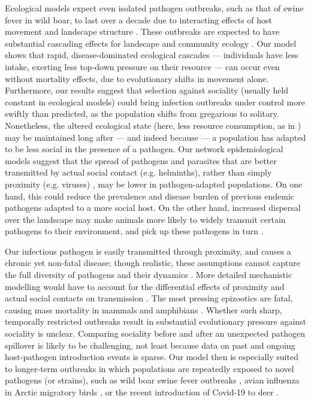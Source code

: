 Ecological models expect even isolated pathogen outbreaks, such as that of swine fever in wild boar, to last over a decade due to interacting effects of host movement and landscape structure \citep{scherer2020}.
These outbreaks are expected to have substantial cascading effects for landscape and community ecology \citep{monk2022}.
Our model shows that rapid, disease-dominated ecological cascades --- individuals have less intake, exerting less top-down pressure on their resource --- can occur even without mortality effects, due to evolutionary shifts in movement alone.
Furthermore, our results suggest that selection against sociality (usually held constant in ecological models) could bring infection outbreaks under control more swiftly than predicted, as the population shifts from gregarious to solitary.
Nonetheless, the altered ecological state (here, less resource consumption, as in \citealt{monk2022}) may be maintained long after --- and indeed because --- a population has adapted to be less social in the presence of a pathogen.
Our network epidemiological models suggest that the spread of pathogens and parasites that are better transmitted by actual social contact (e.g. helminths), rather than simply proximity (e.g. viruses) \citep{rimbach2015}, may be lower in pathogen-adapted populations.
On one hand, this could reduce the prevalence and disease burden of previous endemic pathogens adapted to a more social host.
On the other hand, increased dispersal over the landscape may make animals more likely to widely transmit certain pathogens to their environment, and pick up these pathogens in turn \citep[][]{rimbach2015,weinstein2018,scherer2020}.

Our infectious pathogen is easily transmitted through proximity, and causes a chronic yet non-fatal disease; though realistic, these assumptions cannot capture the full diversity of pathogens and their dynamics \citep{white2018,scherer2020, lunn2021}.
More detailed mechanistic modelling would have to account for the differential effects of proximity and actual social contacts on transmission \citep{rimbach2015}.
The most pressing epizootics are fatal, causing mass mortality in mammals \citep{blehert2009, fereidouni2019} and amphibians \citep{scheele2019,sanderson2020}.
Whether such sharp, temporally restricted outbreaks result in substantial evolutionary pressure against sociality is unclear.
Comparing sociality before and after an unexpected pathogen spillover \citep[as in][]{kuchipudi2022} is likely to be challenging, not least because data on past and ongoing host-pathogen introduction events is sparse.
Our model then is especially suited to longer-term outbreaks in which populations are repeatedly exposed to novel pathogens (or strains), such as wild boar swine fever outbreaks \citep{scherer2020}, avian influenza in Arctic migratory birds \citep{globconsorth5n82016}, or the recent introduction of Covid-19 to deer \citep{kuchipudi2022}.

